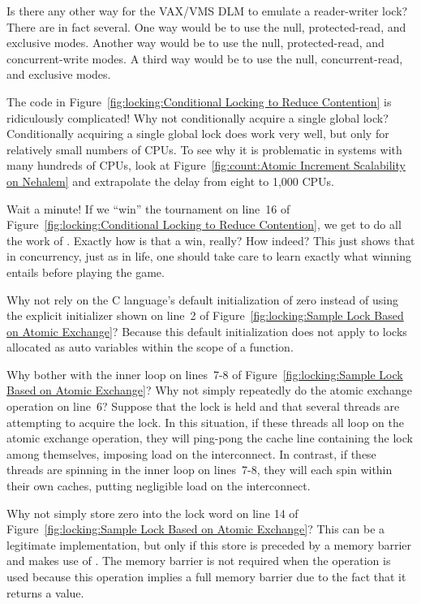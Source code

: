 \QuickQ{}
	Is there any other way for the VAX/VMS DLM to emulate
	a reader-writer lock?
\QuickA{}
	There are in fact several.
	One way would be to use the null, protected-read, and exclusive
	modes.
	Another way would be to use the null, protected-read, and
	concurrent-write modes.
	A third way would be to use the null, concurrent-read, and
	exclusive modes.

\QuickQ{}
	The code in
	Figure~\ref{fig:locking:Conditional Locking to Reduce Contention}
	is ridiculously complicated!
	Why not conditionally acquire a single global lock?
\QuickA{}
	Conditionally acquiring a single global lock does work very well,
	but only for relatively small numbers of CPUs.
	To see why it is problematic in systems with many hundreds of
	CPUs, look at
	Figure~\ref{fig:count:Atomic Increment Scalability on Nehalem}
	and extrapolate the delay from eight to 1,000 CPUs.

\QuickQ{}
	Wait a minute!
	If we ``win'' the tournament on line~16 of
	Figure~\ref{fig:locking:Conditional Locking to Reduce Contention},
	we get to do all the work of .
	Exactly how is that a win, really?
\QuickA{}
	How indeed?
	This just shows that in concurrency, just as in life, one
	should take care to learn exactly what winning entails before
	playing the game.

\QuickQ{}
	Why not rely on the C language's default initialization of
	zero instead of using the explicit initializer shown on
	line~2 of
	Figure~\ref{fig:locking:Sample Lock Based on Atomic Exchange}?
\QuickA{}
	Because this default initialization does not apply to locks
	allocated as auto variables within the scope of a function.

\QuickQ{}
	Why bother with the inner loop on lines~7-8 of
	Figure~\ref{fig:locking:Sample Lock Based on Atomic Exchange}?
	Why not simply repeatedly do the atomic exchange operation
	on line~6?
\QuickA{}
	Suppose that the lock is held and that several threads
	are attempting to acquire the lock.
	In this situation, if these threads all loop on the atomic
	exchange operation, they will ping-pong the cache line
	containing the lock among themselves, imposing load
	on the interconnect.
	In contrast, if these threads are spinning in the inner
	loop on lines~7-8, they will each spin within their own
	caches, putting negligible load on the interconnect.

\QuickQ{}
	Why not simply store zero into the lock word on line 14 of
	Figure~\ref{fig:locking:Sample Lock Based on Atomic Exchange}?
\QuickA{}
	This can be a legitimate implementation, but only if
	this store is preceded by a memory barrier and makes use
	of .
	The memory barrier is not required when the 
	operation is used because this operation implies a
	full memory barrier due to the fact that it returns
	a value.

